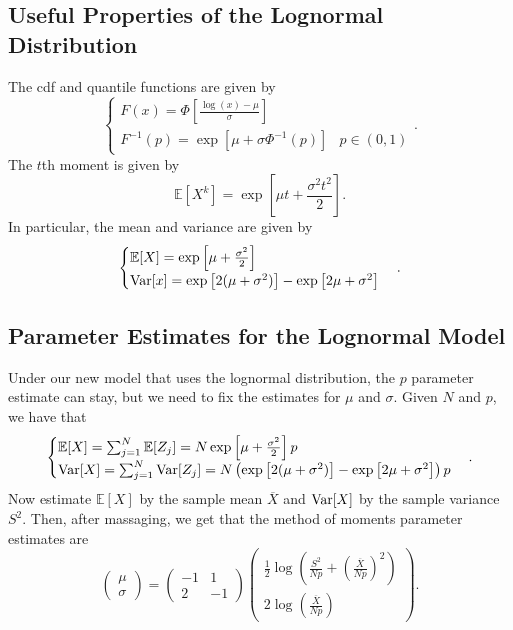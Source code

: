 \documentclass{article}
\begin{document}
\subsection{Useful Properties of the Lognormal Distribution}
The cdf and quantile functions are given by
\[
  \begin{cases}
    F(x) = \Phi\left[\frac{\log(x)-\mu}\sigma\right] \\
    F^{-1}(p) = \exp\left[\mu + \sigma\Phi^{-1}(p)\right] & p\in(0,1)
  \end{cases}.
\]
The $t$th moment is given by
\[
  \mathbb E\left[X^k\right] = \exp\left[\mu t + \frac{\sigma^2t^2}2\right].
\]
In particular, the mean and variance are given by
\[
  \begin{cases}
    \mathbb E[X] = \exp\left[\mu + \frac{\sigma^2}2\right] \\
    \operatorname{Var}[x] = \exp\left[2(\mu+\sigma^2)\right] - \exp\left[2\mu+\sigma^2\right]
  \end{cases}.
\]

\subsection{Parameter Estimates for the Lognormal Model}
Under our new model that uses the lognormal distribution, the $p$ parameter estimate can stay, but we need to fix the estimates for $\mu$ and $\sigma$. Given $N$ and $p$, we have that
\[
  \begin{cases}
    \mathbb E[X] = \sum_{j=1}^N \mathbb E[Z_j] = N\exp\left[\mu + \frac{\sigma^2}2\right]p \\
    \operatorname{Var}[X] = \sum_{j=1}^N \operatorname{Var}[Z_j] = N\left(\exp\left[2(\mu+\sigma^2)\right] - \exp\left[2\mu+\sigma^2\right]\right)p
  \end{cases}.
\]
Now estimate $\mathbb E[X]$ by the sample mean $\overline X$ and $\operatorname{Var}[X]$ by the sample variance $S^2$. Then, after massaging, we get that the method of moments parameter estimates are
\[
  \begin{pmatrix}\mu\\\sigma\end{pmatrix} = \begin{pmatrix}-1&1\\2&-1\end{pmatrix}\begin{pmatrix}\frac12\log\left(\frac{S^2}{Np} + \left(\frac{\overline X}{Np}\right)^2\right)\\2\log\left(\frac{\overline X}{Np}\right)\end{pmatrix}.
\]
\end{document}
